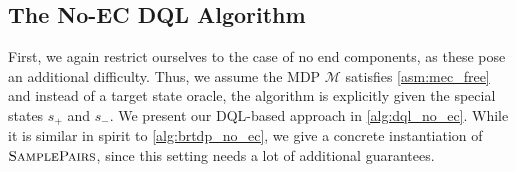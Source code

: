 \documentclass{article}
\DeclareMathOperator*{\argmax}{arg\,max}
\newcommand{\MDP}{\mathcal{M}}
\newcommand{\States}{S}
\newcommand{\initialstate}{\hat{s}}
\DeclareMathOperator{\val}{\mathcal{V}}
\newcommand{\upperbound}{\mathsf{Up}}
\newcommand{\lowerbound}{\mathsf{Lo}}
\newcommand{\targetstate}{s_+}
\newcommand{\sinkstate}{s_-}
\newcommand{\samplepath}{\textsc{SamplePairs}}
\newcommand{\successor}{\mathsf{succ}}
\newcommand{\acc}{\texttt{acc}}
\newcommand{\visitcount}{\texttt{count}}
\newcommand{\learn}{\texttt{learn}}
\newcommand{\learnyes}{\texttt{yes}}
\newcommand{\algostep}{\mathsf{t}}
\newcommand{\algoepisode}{\mathsf{e}}
\newcommand{\umaxactions}{\mathsf{MaxA}}
\begin{document}
\subsection{The No-EC DQL Algorithm}

First, we again restrict ourselves to the case of no end components, as these pose an additional difficulty.
Thus, we assume the MDP $\MDP$ satisfies \cref{asm:mec_free} and instead of a target state oracle, the algorithm is explicitly given the special states $\targetstate$ and $\sinkstate$.
We present our DQL-based approach in \cref{alg:dql_no_ec}.
While it is similar in spirit to \cref{alg:brtdp_no_ec}, we give a concrete instantiation of $\samplepath$, since this setting needs a lot of additional guarantees.




\end{document}
